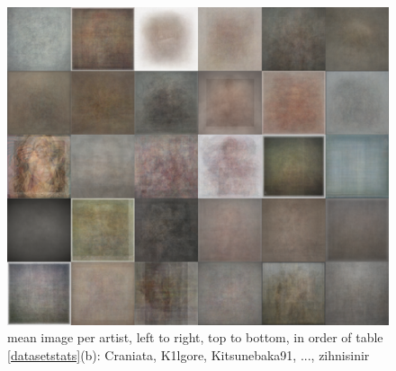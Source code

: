 \begin{figure}[htb]
  \includegraphics[width=1\linewidth]{img/datasetAvg.png}
  \caption{mean image per artist, left to right, top to bottom, in order of table \ref{datasetstats}(b): Craniata, K1lgore, Kitsunebaka91, ..., zihnisinir }
  \label{fig:avgDataset}
\end{figure}


